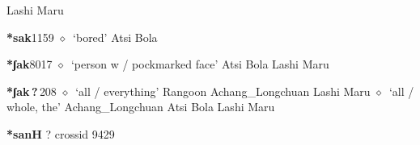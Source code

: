 \begin{list}{}{\leftmargin=1.5em \itemindent=-1.5em}
         Lashi 
\hspace{1ex}
         Maru 
  \item {\footnotesize \textbf{*sak}}{\tiny 1159}
\hspace{1ex}
         $\diamond$~`bored'
         Atsi 
\hspace{1ex}
         Bola 
  \item {\footnotesize \textbf{*ʃak}}{\tiny 8017}
\hspace{1ex}
         $\diamond$~`person w / pockmarked face'
         Atsi 
\hspace{1ex}
         Bola 
\hspace{1ex}
         Lashi 
\hspace{1ex}
         Maru 
  \item {\footnotesize \textbf{*ʃak\,?\,}}{\tiny 208}
\hspace{1ex}
         $\diamond$~`all / everything'
         Rangoon 
\hspace{1ex}
         Achang\_Longchuan 
\hspace{1ex}
         Lashi 
\hspace{1ex}
         Maru 
\hspace{1ex}
         $\diamond$~`all / whole, the'
         Achang\_Longchuan 
\hspace{1ex}
         Atsi 
\hspace{1ex}
         Bola 
\hspace{1ex}
         Lashi 
\hspace{1ex}
         Maru 
  \end{list}
\item
\textbf{*sanH}
?
  {\tiny crossid 9429}
